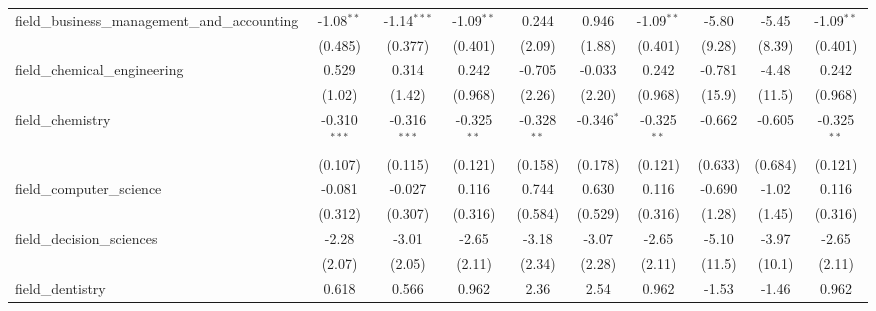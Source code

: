 \begin{tabular}{lccccccccc}
   field\_business\_management\_and\_accounting                & -1.08$^{**}$   & -1.14$^{***}$  & -1.09$^{**}$  & 0.244          & 0.946          & -1.09$^{**}$  & -5.80        & -5.45       & -1.09$^{**}$\\   
                                                               & (0.485)        & (0.377)        & (0.401)       & (2.09)         & (1.88)         & (0.401)       & (9.28)       & (8.39)      & (0.401)\\   
   field\_chemical\_engineering                                & 0.529          & 0.314          & 0.242         & -0.705         & -0.033         & 0.242         & -0.781       & -4.48       & 0.242\\   
                                                               & (1.02)         & (1.42)         & (0.968)       & (2.26)         & (2.20)         & (0.968)       & (15.9)       & (11.5)      & (0.968)\\   
   field\_chemistry                                            & -0.310$^{***}$ & -0.316$^{***}$ & -0.325$^{**}$ & -0.328$^{**}$  & -0.346$^{*}$   & -0.325$^{**}$ & -0.662       & -0.605      & -0.325$^{**}$\\   
                                                               & (0.107)        & (0.115)        & (0.121)       & (0.158)        & (0.178)        & (0.121)       & (0.633)      & (0.684)     & (0.121)\\   
   field\_computer\_science                                    & -0.081         & -0.027         & 0.116         & 0.744          & 0.630          & 0.116         & -0.690       & -1.02       & 0.116\\   
                                                               & (0.312)        & (0.307)        & (0.316)       & (0.584)        & (0.529)        & (0.316)       & (1.28)       & (1.45)      & (0.316)\\   
   field\_decision\_sciences                                   & -2.28          & -3.01          & -2.65         & -3.18          & -3.07          & -2.65         & -5.10        & -3.97       & -2.65\\   
                                                               & (2.07)         & (2.05)         & (2.11)        & (2.34)         & (2.28)         & (2.11)        & (11.5)       & (10.1)      & (2.11)\\   
   field\_dentistry                                            & 0.618          & 0.566          & 0.962         & 2.36           & 2.54           & 0.962         & -1.53        & -1.46       & 0.962\\   

\end{tabular}
